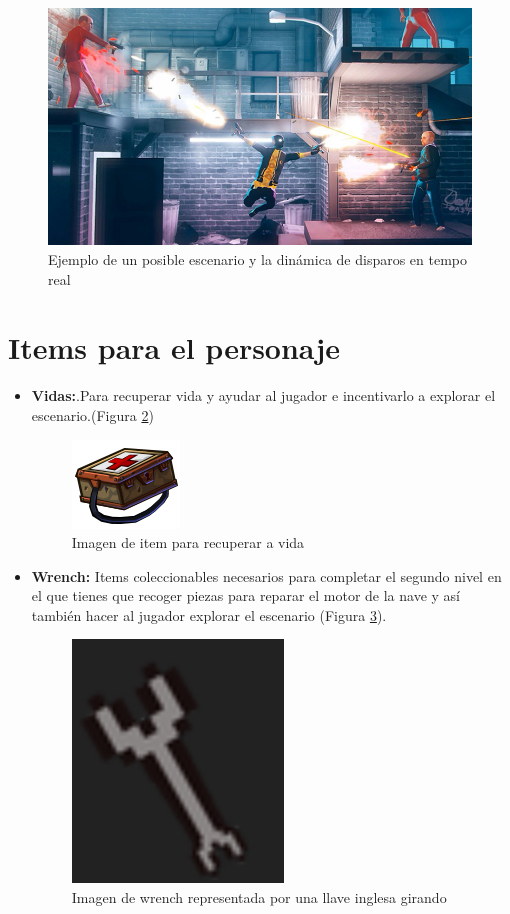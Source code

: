 \begin{figure}[H]
	\centering
	\includegraphics[scale=0.45]{imagenes/5.png}	
	\caption{\label{fig:ambiente}Ejemplo de un posible escenario y la dinámica de disparos en tempo real}
\end{figure}

\section{Items para el personaje}
\begin{itemize}
	\item \textbf{Vidas:}.Para recuperar vida y ayudar al jugador e incentivarlo a explorar el escenario.(Figura \ref{fig:Ejemplo Vida})
	\begin{figure}[H]
		\centering
    	\includegraphics[scale=0.95]{imagenes/vida.png}	
		\caption{\label{fig:Ejemplo Vida}Imagen de item para recuperar a vida}
	\end{figure}
	\item \textbf{Wrench:} Items coleccionables necesarios para completar
			el segundo nivel en el que tienes que recoger piezas para reparar el motor de la nave y así también hacer al jugador explorar el escenario (Figura \ref{fig:Wrench}).
	\begin{figure}[H]
		\centering
		\includegraphics[scale=0.55]{imagenes/wrench.png}	
		\caption{\label{fig:Wrench}Imagen de wrench representada por una llave inglesa girando}
	\end{figure}
\end{itemize}

